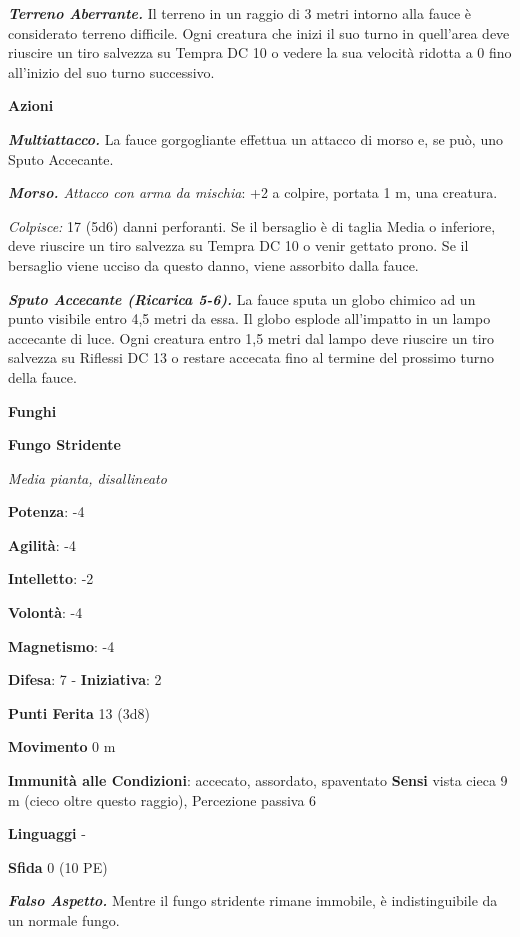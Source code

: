\begin{multicols}{2}
\emph{\textbf{Terreno Aberrante.}} Il terreno in un raggio di 3 metri
intorno alla fauce è considerato terreno difficile. Ogni creatura che
inizi il suo turno in quell'area deve riuscire un tiro salvezza su Tempra
DC 10 o vedere la sua velocità ridotta a 0 fino all'inizio del suo turno
successivo.

\smallskip\textbf{Azioni}

\emph{\textbf{Multiattacco.}} La fauce gorgogliante effettua un attacco
di morso e, se può, uno Sputo Accecante.

\emph{\textbf{Morso.} Attacco con arma da mischia}: +2 a colpire,
portata 1 m, una creatura.

\emph{Colpisce:} 17 (5d6) danni perforanti. Se il bersaglio è di taglia
Media o inferiore, deve riuscire un tiro salvezza su Tempra DC 10 o venir
gettato prono. Se il bersaglio viene ucciso da questo danno, viene
assorbito dalla fauce.

\emph{\textbf{Sputo Accecante (Ricarica 5-6).}} La fauce sputa un globo
chimico ad un punto visibile entro 4,5 metri da essa. Il globo esplode
all'impatto in un lampo accecante di luce. Ogni creatura entro 1,5 metri
dal lampo deve riuscire un tiro salvezza su Riflessi DC 13 o restare
accecata fino al termine del prossimo turno della fauce.



\textbf{Funghi}

\textbf{Fungo Stridente}

\emph{Media pianta, disallineato}

\textbf{Potenza}: -4

\textbf{Agilità}: -4

\textbf{Intelletto}: -2

\textbf{Volontà}: -4

\textbf{Magnetismo}: -4

\textbf{Difesa}: 7 - \textbf{Iniziativa}: 2

\textbf{Punti Ferita} 13 (3d8)

\textbf{Movimento} 0 m

\textbf{Immunità alle Condizioni}: accecato, assordato, spaventato
\textbf{Sensi} vista cieca 9 m (cieco oltre questo raggio), Percezione
passiva 6

\textbf{Linguaggi} -

\textbf{Sfida} 0 (10 PE)\smallskip

\emph{\textbf{Falso Aspetto.}} Mentre il fungo stridente rimane
immobile, è indistinguibile da un normale fungo.


\end{multicols}

